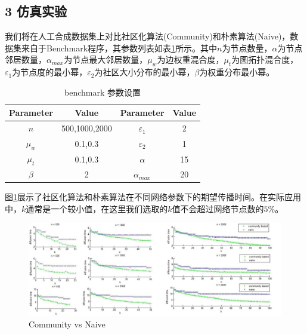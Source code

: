 \documentclass[UTF8]{ctexart}
\begin{document}
\subsection*{3 仿真实验}
\par 我们将在人工合成数据集上对比社区化算法(Community)和朴素算法(Naive)，数据集来自于Benchmark程序，其参数列表如表\ref{Parameter}所示。其中$n$为节点数量，$\alpha$为节点邻居数量，$\alpha_{max}$为节点最大邻居数量，$\mu_w$为边权重混合度，$\mu_t$为图拓扑混合度，$\varepsilon_1$为节点度的最小幂，$\varepsilon_2$为社区大小分布的最小幂，$\beta$为权重分布最小幂。
\begin{table}[H]
\centering
\begin{tabular}{|c|c|c|c|}
\hline
\textbf{Parameter} & \textbf{Value} & \textbf{Parameter} & \textbf{Value}  \\
\hline
\hline
$n$ & 500,1000,2000 & $\varepsilon_1$  & 2  \\
$\mu_w$ & 0.1,0.3 &  $\varepsilon_2$ & 1  \\
$\mu_t$ & 0.1,0.3 &  $\alpha$ & 15 \\
$\beta$ & 2       & $\alpha_{max}$   &  20 \\
\hline
\end{tabular}
\caption{benchmark 参数设置}
\label{Parameter}
\end{table} 
\par 图\ref{fig-res}展示了社区化算法和朴素算法在不同网络参数下的期望传播时间。在实际应用中，$k$通常是一个较小值，在这里我们选取的$k$值不会超过网络节点数的$5\%$。
\begin{figure}[H]
    \centering
    \includegraphics[width=16cm]{fig-res.jpg}
    \caption{Community vs Naive}
    \label{fig-res}
\end{figure}
\end{document}
